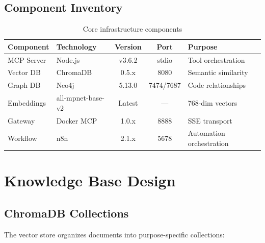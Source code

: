 \documentclass[11pt,letterpaper,twoside]{article}
\begin{document}
\subsection{Component Inventory}

\begin{table}[H]
\centering
\renewcommand{\arraystretch}{1.2}
\begin{tabular}{l|l|c|c|l}
\toprule
\textbf{Component} & \textbf{Technology} & \textbf{Version} & \textbf{Port} & \textbf{Purpose} \\
\midrule
MCP Server & Node.js & v3.6.2 & stdio & Tool orchestration \\
Vector DB & ChromaDB & 0.5.x & 8080 & Semantic similarity \\
Graph DB & Neo4j & 5.13.0 & 7474/7687 & Code relationships \\
Embeddings & all-mpnet-base-v2 & Latest & — & 768-dim vectors \\
Gateway & Docker MCP & 1.0.x & 8888 & SSE transport \\
Workflow & n8n & 2.1.x & 5678 & Automation orchestration \\
\bottomrule
\end{tabular}
\caption{Core infrastructure components}
\end{table}

\newpage
\section{Knowledge Base Design}

\subsection{ChromaDB Collections}

The vector store organizes documents into purpose-specific collections:
\end{document}
